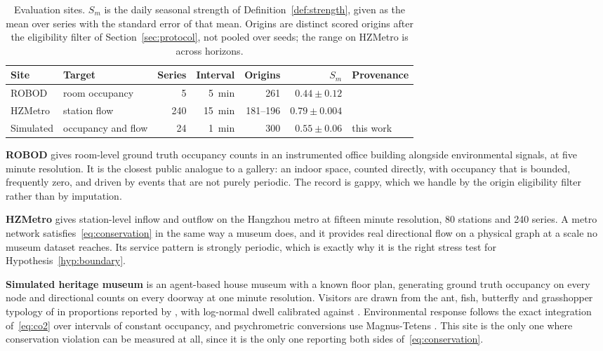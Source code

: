 \documentclass[11pt]{article}
\theoremstyle{plain}
\theoremstyle{definition}
\theoremstyle{remark}
\begin{document}
\begin{table}[htbp]
\centering
\caption{Evaluation sites. $S_m$ is the daily seasonal strength of Definition~\ref{def:strength}, given as the mean over series with the standard error of that mean. Origins are distinct scored origins after the eligibility filter of Section~\ref{sec:protocol}, not pooled over seeds; the range on HZMetro is across horizons.}
\label{tab:data}
\small
\begin{tabular}{llrrrrl}
\toprule
Site & Target & Series & Interval & Origins & $S_m$ & Provenance \\
\midrule
ROBOD    & room occupancy  & 5   & \SI{5}{\minute}  & 261 & $0.44 \pm 0.12$ & \citet{tekler2022robod} \\
HZMetro  & station flow    & 240 & \SI{15}{\minute} & 181--196 & $0.79 \pm 0.004$ & \citet{liu2022pvcgn} \\
Simulated & occupancy and flow & 24 & \SI{1}{\minute} & 300 & $0.55 \pm 0.06$ & this work \\
\bottomrule
\end{tabular}
\end{table}

\textbf{ROBOD} \citep{tekler2022robod} gives room-level ground truth occupancy counts in an instrumented office building alongside environmental signals, at five minute resolution. It is the closest public analogue to a gallery: an indoor space, counted directly, with occupancy that is bounded, frequently zero, and driven by events that are not purely periodic. The record is gappy, which we handle by the origin eligibility filter rather than by imputation.

\textbf{HZMetro} \citep{liu2022pvcgn} gives station-level inflow and outflow on the Hangzhou metro at fifteen minute resolution, \num{80} stations and \num{240} series. A metro network satisfies~\eqref{eq:conservation} in the same way a museum does, and it provides real directional flow on a physical graph at a scale no museum dataset reaches. Its service pattern is strongly periodic, which is exactly why it is the right stress test for Hypothesis~\ref{hyp:boundary}.

\textbf{Simulated heritage museum} is an agent-based house museum with a known floor plan, generating ground truth occupancy on every node and directional counts on every doorway at one minute resolution. Visitors are drawn from the ant, fish, butterfly and grasshopper typology of \citet{veron1983} in proportions reported by \citet{zancanaro2007}, with log-normal dwell calibrated against \citet{yoshimura2014louvre}. Environmental response follows the exact integration of~\eqref{eq:co2} over intervals of constant occupancy, and psychrometric conversions use Magnus-Tetens \citep{alduchov1996}. This site is the only one where conservation violation can be measured at all, since it is the only one reporting both sides of~\eqref{eq:conservation}.
\end{document}
